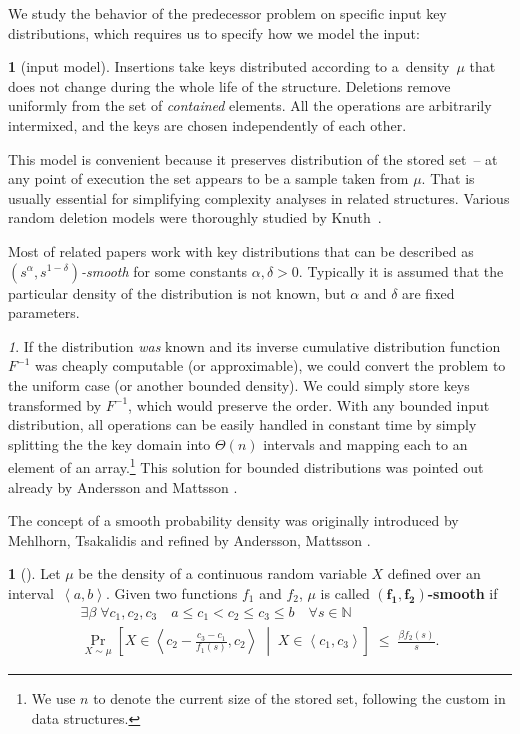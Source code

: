\documentclass[
submission
]{dmtcs-episciences}
\theoremstyle{plain}
\theoremstyle{definition}
\newtheorem{defn}[thm]{\protect\definitionname}
\theoremstyle{remark}
\newtheorem*{rem*}{\protect\remarkname}
\theoremstyle{plain}
\theoremstyle{plain}
\providecommand{\definitionname}{Definition}
\providecommand{\remarkname}{Remark}
\def\interval#1#2{\left\langle#1,#2\right\rangle}
\def\lespaces{\;\le\;}
\def\ProbParam#1#2{\Pr_{#1}\!\left[#2\right]}
\def\natural{\mathbb{N}}
\def\emphDef#1{{\bf#1}}
\def\emphDefMath#1{\mathbf{#1}}
\begin{document}
We study the behavior of the predecessor problem on specific input
key distributions, which requires us to specify how we model the input:
\begin{defn}[input model]
Insertions take keys distributed according to a~density~$\mu$ that
does not change during the whole life of the structure. Deletions
remove uniformly from the set of \emph{contained} elements. All the
operations are arbitrarily intermixed, and the keys are chosen independently
of each other.
\end{defn}
This model is convenient because it preserves distribution of the
stored set~– at any point of execution the set appears to be a sample
taken from $\mu$. That is usually essential for simplifying complexity
analyses in related structures. Various random deletion models were
thoroughly studied by Knuth~\cite{Knuth77}.

Most of related papers work with key distributions that can be described
as \emph{$\left(s^{\alpha},s^{1-\delta}\right)$-smooth} for some
constants $\alpha,\delta>0$. Typically it is assumed that the particular
density of the distribution is not known, but $\alpha$ and $\delta$
are fixed parameters.
\begin{rem*}
If the distribution \emph{was} known and its inverse cumulative distribution
function $F^{-1}$ was cheaply computable (or approximable), we could
convert the problem to the uniform case (or another bounded density).
We could simply store keys transformed by $F^{-1}$, which would preserve
the order. With any bounded input distribution, all operations can
be easily handled in constant time by simply splitting the the key
domain into $\Theta(n)$ intervals and mapping each to an element
of an array.\footnote{We use $n$ to denote the current size of the stored set, following
the custom in data structures.} This solution for bounded distributions was pointed out already by
Andersson and Mattsson \cite[sec. 5.2]{AndersM93}.
\end{rem*}
The concept of a smooth probability density was originally introduced by Mehlhorn, Tsakalidis \cite{MehlT93} and refined by Andersson, Mattsson \cite{AndersM93}.
\begin{defn}[\cite{KMSTTZ06}] \label{def:smooth}
	Let $\mu$ be the density of a continuous random variable $X$ defined over an interval~$\interval a b$. Given two functions $f_1$ and $f_2$, $\mu$ is called \emphDef{$\emphDefMath{(f_1,f_2)}$-smooth} if
	\begin{multline*}
		\exists\beta \; \forall c_1,c_2,c_3 \quad a \le c_1 < c_2 \le c_3 \le b \quad \forall s \in \natural \\
		\ProbParam{X \sim \mu}{  X \in \interval{ c_2 - \frac{c_3-c_1}{f_1(s)} }{c_2} \; \middle| \; X \in \interval{c_1}{c_3}  }
		\lespaces \frac{\beta f_2(s)}{s}.
	\end{multline*}
\end{defn}
\end{document}
